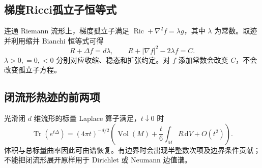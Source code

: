\documentclass[../main.tex]{subfiles}
\begin{document}
\subsection{梯度Ricci孤立子恒等式}
连通 Riemann 流形上，梯度孤立子满足 $\operatorname{Ric}+\nabla^2f=\lambda g$，其中 $\lambda$ 为常数。取迹并利用缩并 Bianchi 恒等式可得
\[
R+\Delta f=d\lambda,\qquad
R+|\nabla f|^2-2\lambda f=C.
\]
$\lambda>0,=0,<0$ 分别对应收缩、稳态和扩张约定。对 $f$ 添加常数会改变 $C$，不会改变孤立子方程。
\subsection{闭流形热迹的前两项}
光滑闭 $d$ 维流形的标量 Laplace 算子满足，$t\downarrow0$ 时
\[
\operatorname{Tr}(e^{t\Delta})
=(4\pi t)^{-d/2}
\left(\operatorname{Vol}(M)+\frac t6\int_MR\,\mathrm dV+O(t^2)\right).
\]
体积与总标量曲率因此可由谱恢复。有边界时会出现半整数次项及边界条件贡献；不能把闭流形展开原样用于 Dirichlet 或 Neumann 边值谱。
\clearpage
\end{document}
